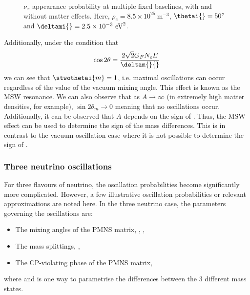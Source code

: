 \begin{figure}[h]
  \centering
  \begin{adjustbox}{max totalsize={.6\textwidth}, center}
    
  \end{adjustbox}
  \caption[Two neutrino appearance probabilities with and without matter effects.]{$\nu_{x}$ appearance probability at multiple fixed baselines, with and without matter effects. Here, $\rho_{e} = 8.5 \times 10^{25}~\text{m}^{-3}$, $\thetai{} = 50^{\circ}$ and $\deltami{} = 2.5 \times 10^{-3}~\text{eV}^{2}$.}
  \label{fig:twoNuMSW}
\end{figure}

Additionally, under the condition that
\begin{equation}
  \cos 2\theta = \frac{2 \sqrt{2} G_{F} N_{e} E}{\deltam{}{}}
\end{equation}
we can see that $\stwothetai{m} = 1$, i.e. maximal oscillations can occur regardless of the value of the vacuum mixing angle.
This effect is known as the MSW resonance.
We can also observe that as $A \rightarrow \infty$ (in extremely high matter densities, for example), $\sin 2\theta_{m} \rightarrow 0$ meaning that no oscillations occur.
Additionally, it can be observed that $A$ depends on the sign of \deltami{}.
Thus, the MSW effect can be used to determine the sign of the mass differences.
This is in contrast to the vacuum oscillation case where it is not possible to determine the sign of \deltami{}.

\subsubsection{Three neutrino oscillations}
\label{sec:theory:theory:threeNeutrino}

For three flavours of neutrino, the oscillation probabilities become significantly more complicated.
However, a few illustrative oscillation probabilities or relevant approximations are noted here.
In the three neutrino case, the parameters governing the oscillations are:
\begin{itemize}
\item The mixing angles of the PMNS matrix, , , 
\item The mass splittings, , 
\item The CP-violating phase of the PMNS matrix, \dcp
\end{itemize}
where  and  is one way to parametrise the differences between the 3 different mass states.

